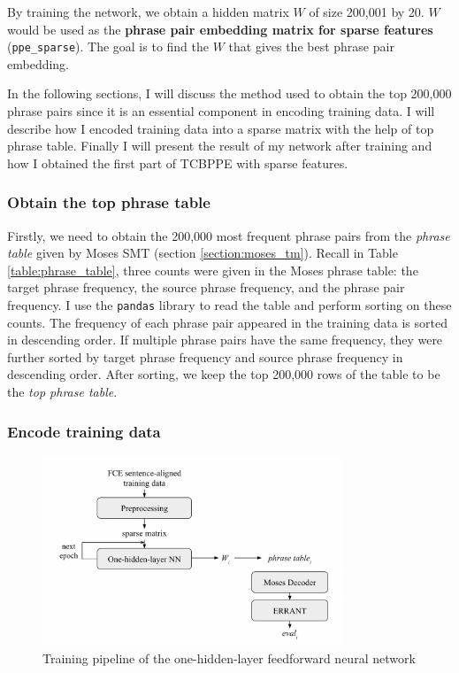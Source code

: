 \documentclass[12pt,a4paper,twoside,openright]{report}
\begin{document}
By training the network, we obtain a hidden matrix $W$ of size 200,001 by 20. $W$ would be used as the \textbf{phrase pair embedding matrix for sparse features} (\texttt{ppe\_sparse}). The goal is to find the $W$ that gives the best phrase pair embedding.

In the following sections, I will discuss the method used to obtain the top 200,000 phrase pairs since it is an essential component in encoding training data. I will describe how I encoded training data into a sparse matrix with the help of top phrase table. Finally I will present the result of my network after training and how I obtained the first part of TCBPPE with sparse features.

\subsubsection{Obtain the top phrase table}
Firstly, we need to obtain the 200,000 most frequent phrase pairs from the \textit{phrase table} given by Moses SMT (section \ref{section:moses_tm}). Recall in Table \ref{table:phrase_table}, three counts were given in the Moses phrase table: the target phrase frequency, the source phrase frequency, and the phrase pair frequency. I use the \texttt{pandas} library to read the table and perform sorting on these counts. The frequency of each phrase pair appeared in the training data is sorted in descending order. If multiple phrase pairs have the same frequency, they were further sorted by target phrase frequency and source phrase frequency in descending order. After sorting, we keep the top 200,000 rows of the table to be the \textit{top phrase table}.

\subsubsection{Encode training data}
\begin{figure}[ht]
\centering
\includegraphics[width=0.8\textwidth]{images/sparse_pipeline.png}
\caption{Training pipeline of the one-hidden-layer feedforward neural network}
\label{fig:sparse_pipeline}
\end{figure}
\end{document}
